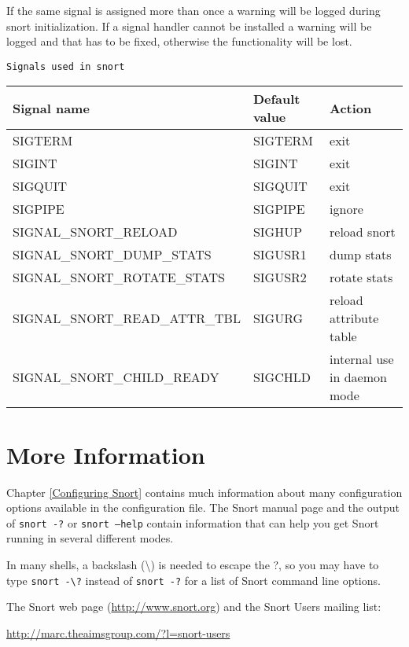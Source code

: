 \documentclass[english]{report}
\newenvironment{note}{
\samepage
    \vspace{10pt}{\textsf{
        {\hspace{7pt}\Huge{$\triangle$\hspace{-12.5pt}{\Large{$^!$}}}}\hspace{5pt}
        {\Large{NOTE}}
    }
    }
   \begin{center}
    \par\vspace{-17pt}

    \begin{lrbox}{\savepar}
    \begin{minipage}[r]{6in}
}
{
    \end{minipage}
    \end{lrbox}
    \fbox{
        \usebox{
            \savepar
	}
    }
    \par\vskip10pt
    \end{center}
}
\newenvironment{note}{
        \begin{rawhtml}
        <p><table border="1"><tr><td><b>
        Note:&nbsp;&nbsp;</b>
        \end{rawhtml}
}{
        \begin{rawhtml}
        </b></td></tr></table></p>
        \end{rawhtml}
}
\begin{document}
If the same signal is assigned more than once a warning will be logged 
during snort initialization. If a signal handler cannot be installed a warning
will be logged and that has to be fixed, otherwise the functionality will be lost.

\texttt{Signals used in snort}
\label{signalactions}
\begin{tabular}{|l|l|l|}
\hline
Signal name & Default value & Action \\
\hline
\hline
SIGTERM & SIGTERM & exit \\
\hline
SIGINT & SIGINT & exit \\
\hline
SIGQUIT & SIGQUIT & exit \\
\hline
SIGPIPE & SIGPIPE & ignore \\
\hline
SIGNAL\_SNORT\_RELOAD & SIGHUP & reload snort \\
\hline
SIGNAL\_SNORT\_DUMP\_STATS & SIGUSR1 & dump stats \\
\hline
SIGNAL\_SNORT\_ROTATE\_STATS & SIGUSR2 & rotate stats \\
\hline
SIGNAL\_SNORT\_READ\_ATTR\_TBL & SIGURG & reload attribute table \\
\hline
SIGNAL\_SNORT\_CHILD\_READY & SIGCHLD & internal use in daemon mode \\
\hline
\end{tabular}

\section{More Information}

Chapter \ref{Configuring Snort} contains much information about many
configuration options available in the configuration file.  The Snort manual
page and the output of \texttt{snort -?} or \texttt{snort --help} contain
information that can help you get Snort running in several different modes.

\begin{note}

In many shells, a backslash (\textbackslash{}) is needed to escape the ?, so
you may have to type \texttt{snort -\textbackslash{}?} instead of \texttt{snort
-?} for a list of Snort command line options.

\end{note}

The Snort web page (\url{http://www.snort.org}) and the Snort Users mailing
list:

\url{http://marc.theaimsgroup.com/?l=snort-users}
\end{document}
